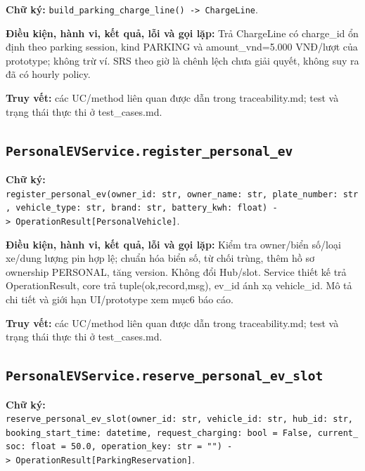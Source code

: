 \documentclass[11pt,a4paper]{article}
\begin{document}
\textbf{Chữ ký:}
\texttt{build\_parking\_charge\_line()\ -\textgreater{}\ ChargeLine}.

\textbf{Điều kiện, hành vi, kết quả, lỗi và gọi lặp:} Trả ChargeLine có
charge\_id ổn định theo parking session, kind PARKING và
amount\_vnd=5.000 VNĐ/lượt của prototype; không trừ ví. SRS theo giờ là
chênh lệch chưa giải quyết, không suy ra đã có hourly policy.

\textbf{Truy vết:} các UC/method liên quan được dẫn trong
traceability.md; test và trạng thái thực thi ở test\_cases.md.

\hypertarget{personalevservice.register_personal_ev}{%
\subsection{\texorpdfstring{\texttt{PersonalEVService.register\_personal\_ev}}{PersonalEVService.register\_personal\_ev}}\label{personalevservice.register_personal_ev}}

\textbf{Chữ ký:}
\texttt{register\_personal\_ev(owner\_id:\ str,\ owner\_name:\ str,\ plate\_number:\ str,\ vehicle\_type:\ str,\ brand:\ str,\ battery\_kwh:\ float)\ -\textgreater{}\ OperationResult{[}PersonalVehicle{]}}.

\textbf{Điều kiện, hành vi, kết quả, lỗi và gọi lặp:} Kiểm tra
owner/biển số/loại xe/dung lượng pin hợp lệ; chuẩn hóa biển số, từ chối
trùng, thêm hồ sơ ownership PERSONAL, tăng version. Không đổi Hub/slot.
Service thiết kế trả OperationResult, core trả tuple(ok,record,msg),
ev\_id ánh xạ vehicle\_id. Mô tả chi tiết và giới hạn UI/prototype xem
mục6 báo cáo.

\textbf{Truy vết:} các UC/method liên quan được dẫn trong
traceability.md; test và trạng thái thực thi ở test\_cases.md.

\hypertarget{personalevservice.reserve_personal_ev_slot}{%
\subsection{\texorpdfstring{\texttt{PersonalEVService.reserve\_personal\_ev\_slot}}{PersonalEVService.reserve\_personal\_ev\_slot}}\label{personalevservice.reserve_personal_ev_slot}}

\textbf{Chữ ký:}
\texttt{reserve\_personal\_ev\_slot(owner\_id:\ str,\ vehicle\_id:\ str,\ hub\_id:\ str,\ booking\_start\_time:\ datetime,\ request\_charging:\ bool\ =\ False,\ current\_soc:\ float\ =\ 50.0,\ operation\_key:\ str\ =\ "")\ -\textgreater{}\ OperationResult{[}ParkingReservation{]}}.
\end{document}
